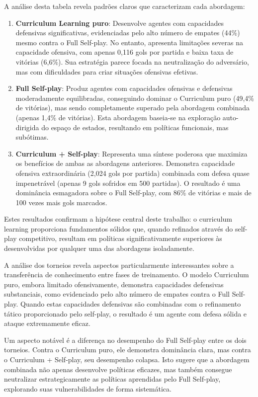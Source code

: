 A análise desta tabela revela padrões claros que caracterizam cada abordagem:

\begin{enumerate}
    \item \textbf{Curriculum Learning puro}: Desenvolve agentes com capacidades defensivas significativas, evidenciadas pelo alto número de empates (44\%) mesmo contra o Full Self-play. No entanto, apresenta limitações severas na capacidade ofensiva, com apenas 0,116 gols por partida e baixa taxa de vitórias (6,6\%). Sua estratégia parece focada na neutralização do adversário, mas com dificuldades para criar situações ofensivas efetivas.
    
    \item \textbf{Full Self-play}: Produz agentes com capacidades ofensivas e defensivas moderadamente equilibradas, conseguindo dominar o Curriculum puro (49,4\% de vitórias), mas sendo completamente superado pela abordagem combinada (apenas 1,4\% de vitórias). Esta abordagem baseia-se na exploração auto-dirigida do espaço de estados, resultando em políticas funcionais, mas subótimas.
    
    \item \textbf{Curriculum + Self-play}: Representa uma síntese poderosa que maximiza os benefícios de ambas as abordagens anteriores. Demonstra capacidade ofensiva extraordinária (2,024 gols por partida) combinada com defesa quase impenetrável (apenas 9 gols sofridos em 500 partidas). O resultado é uma dominância esmagadora sobre o Full Self-play, com 86\% de vitórias e mais de 100 vezes mais gols marcados.
\end{enumerate}

Estes resultados confirmam a hipótese central deste trabalho: o curriculum learning proporciona fundamentos sólidos que, quando refinados através do self-play competitivo, resultam em políticas significativamente superiores às desenvolvidas por qualquer uma das abordagens isoladamente.

A análise dos torneios revela aspectos particularmente interessantes sobre a transferência de conhecimento entre fases de treinamento. O modelo Curriculum puro, embora limitado ofensivamente, demonstra capacidades defensivas substanciais, como evidenciado pelo alto número de empates contra o Full Self-play. Quando estas capacidades defensivas são combinadas com o refinamento tático proporcionado pelo self-play, o resultado é um agente com defesa sólida e ataque extremamente eficaz.

Um aspecto notável é a diferença no desempenho do Full Self-play entre os dois torneios. Contra o Curriculum puro, ele demonstra dominância clara, mas contra o Curriculum + Self-play, seu desempenho colapsa. Isto sugere que a abordagem combinada não apenas desenvolve políticas eficazes, mas também consegue neutralizar estrategicamente as políticas aprendidas pelo Full Self-play, explorando suas vulnerabilidades de forma sistemática.


